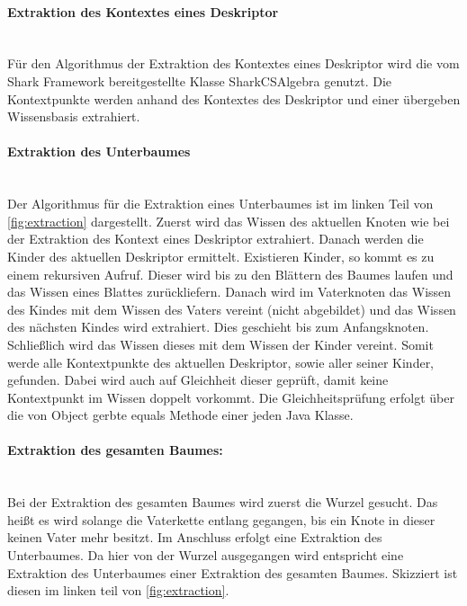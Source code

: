 \documentclass[a4paper]{article}
\begin{document}
	\paragraph{Extraktion des Kontextes eines Deskriptor}\mbox{} \\
	
	Für den Algorithmus der Extraktion des Kontextes eines Deskriptor wird
	die vom Shark Framework bereitgestellte Klasse SharkCSAlgebra genutzt.
	Die Kontextpunkte werden anhand des Kontextes des Deskriptor und einer
	übergeben Wissensbasis extrahiert.
	
	\paragraph{Extraktion des Unterbaumes}\mbox{} \\
	
	Der Algorithmus für die Extraktion eines Unterbaumes ist im linken Teil von
	\autoref{fig:extraction} dargestellt. Zuerst wird das Wissen des aktuellen
	Knoten wie bei der Extraktion des Kontext eines Deskriptor extrahiert.
	Danach werden die Kinder des aktuellen Deskriptor ermittelt. Existieren
	Kinder, so kommt es zu einem rekursiven Aufruf. Dieser wird bis zu den Blättern
	des Baumes laufen und das Wissen eines Blattes zurückliefern. Danach wird
	im Vaterknoten das Wissen des Kindes mit dem Wissen des Vaters vereint (nicht 
	abgebildet) und das Wissen des nächsten Kindes wird extrahiert. Dies geschieht
	bis zum Anfangsknoten. Schließlich wird das Wissen dieses mit dem Wissen der
	Kinder vereint. Somit werde alle Kontextpunkte des aktuellen
	Deskriptor,	sowie aller seiner Kinder, gefunden. Dabei wird auch auf Gleichheit
	dieser geprüft, damit keine Kontextpunkt im Wissen doppelt vorkommt. Die
	Gleichheitsprüfung erfolgt über die von Object gerbte equals Methode einer jeden
	Java Klasse.
	
	\newpage
	\paragraph{Extraktion des gesamten Baumes:}\mbox{} \\
	
	Bei der Extraktion des gesamten Baumes wird zuerst die Wurzel gesucht. Das heißt
	es wird solange die Vaterkette entlang gegangen, bis ein Knote in dieser keinen 		Vater mehr besitzt. Im Anschluss erfolgt eine Extraktion des Unterbaumes. Da
	hier von der Wurzel ausgegangen wird entspricht eine Extraktion des Unterbaumes
	einer Extraktion des gesamten Baumes. Skizziert ist diesen im linken teil von
	\autoref{fig:extraction}. \\
	
\end{document}
